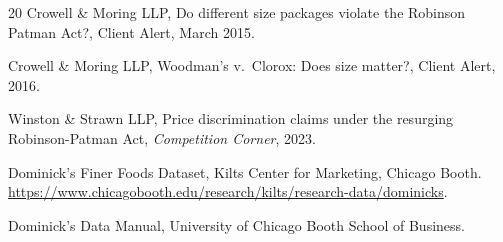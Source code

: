 \documentclass[11pt,a4paper]{article}
\theoremstyle{plain}
\theoremstyle{definition}
\theoremstyle{remark}
\begin{document}
\begin{thebibliography}{20}
Crowell \& Moring LLP,
Do different size packages violate the Robinson Patman Act?,
Client Alert, March 2015.

Crowell \& Moring LLP,
Woodman's v.\ Clorox: Does size matter?,
Client Alert, 2016.

Winston \& Strawn LLP,
Price discrimination claims under the resurging Robinson-Patman Act,
\textit{Competition Corner}, 2023.

Dominick's Finer Foods Dataset,
Kilts Center for Marketing, Chicago Booth.
\url{https://www.chicagobooth.edu/research/kilts/research-data/dominicks}.

Dominick's Data Manual,
University of Chicago Booth School of Business.

\end{thebibliography}
\end{document}
